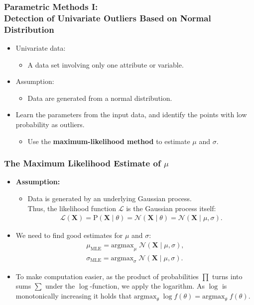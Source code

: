 \begin{frame}
	\frametitle{Parametric Methods I: \\ Detection of Univariate Outliers Based on Normal Distribution}
	\begin{itemize}
		\item Univariate data:
		      \begin{itemize}
			      \item A data set involving only one attribute or variable.
		      \end{itemize}
		\item Assumption:
		      \begin{itemize}
			      \item Data are generated from a normal distribution.
		      \end{itemize}
		\item Learn the parameters from the input data, and identify the points with low probability as outliers.
		      \begin{itemize}
			      \item Use the \textbf{\color{airforceblue}maximum-likelihood method} to estimate $\mu$ and $\sigma$.
		      \end{itemize}
	\end{itemize}
\end{frame}


\begin{frame}
	\frametitle{The Maximum Likelihood Estimate of $\mu$}
	\begin{itemize}
		\item \textbf{Assumption:}
		      \begin{itemize}
			      \item Data is generated by an underlying Gaussian process. \\
			            Thus, the likelihood function $\mathcal{L}$ is the Gaussian process itself:
			            \begin{align}
				            \mathcal{L}(\mathbf{X}) = \text{P}(\mathbf{X} \; \vert \; \theta) = \mathcal{N}(\mathbf{X} \; \vert \; \theta) = \mathcal{N}(\mathbf{X} \; \vert \; \mu, \sigma).
			            \end{align}
		      \end{itemize}
		\item We need to find good estimates for $\mu$ and $\sigma$:
		      \begin{align}
			      \mu_{\text{MLE}} = \text{argmax}_{\mu} \; \mathcal{N}(\mathbf{X} \; \vert \; \mu, \sigma), \\
			      \sigma_{\text{MLE}} = \text{argmax}_{\sigma} \; \mathcal{N}(\mathbf{X} \; \vert \; \mu, \sigma).
		      \end{align}
		\item To make computation easier, as the product of probabilities $\prod$ turns into sums $\sum$ under the $\log$-function, we apply the logarithm. As $\log$ is monotonically increasing it holds that $\text{argmax}_{\theta} \; \log f(\theta) = \text{argmax}_{\theta} \; f(\theta)$.
	\end{itemize}
\end{frame}


